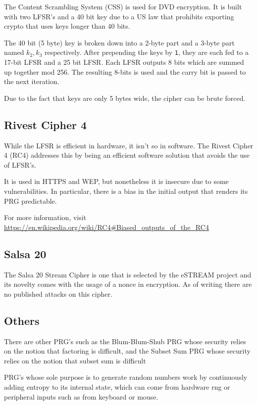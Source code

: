 \documentclass{article}
\begin{document}
\begin{multicols}{2}
The Content Scrambling System (CSS) is used for DVD encryption. It is built with two LFSR's and a 40 bit key due to a US law that prohibits exporting crypto that uses keys longer than 40 bits.

The 40 bit (5 byte) key is broken down into a 2-byte part and a 3-byte part named $k_2, k_3$ respectively. After prepending the keys by \texttt{1}, they are each fed to a 17-bit LFSR and a 25 bit LFSR. Each LFSR outputs 8 bits which are summed up together mod 256. The resulting 8-bits is used and the carry bit is passed to the next iteration.

Due to the fact that keys are only 5 bytes wide, the cipher can be brute forced.

\subsection{Rivest Cipher 4}

While the LFSR is efficient in hardware, it isn't so in software. The Rivest Cipher 4 (RC4) addresses this by being an efficient software solution that avoids the use of LFSR's.

It is used in HTTPS and WEP, but nonetheless it is insecure due to some vulnerabilities. In particular, there is a bias in the initial output that renders its PRG predictable.

For more information, visit \url{https://en.wikipedia.org/wiki/RC4#Biased_outputs_of_the_RC4}

\subsection{Salsa 20}

The Salsa 20 Stream Cipher is one that is selected by the eSTREAM project and its novelty comes with the usage of a nonce in encryption. As of writing there are no published attacks on this cipher.

\subsection{Others}

There are other PRG's such as the Blum-Blum-Shub PRG whose security relies on the notion that factoring is difficult, and the Subset Sum PRG whose security relies on the notion that subset sum is difficult

PRG's whose sole purpose is to generate random numbers work by continuously adding entropy to its internal state, which can come from hardware rng or peripheral inputs such as from keyboard or mouse.


\end{multicols}
\end{document}
